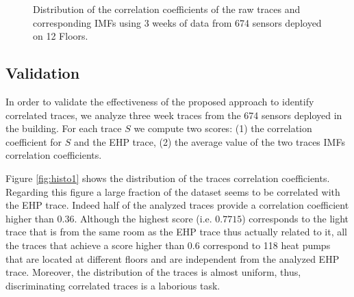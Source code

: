 \begin{figure}
\centering
 \caption{Distribution of the correlation coefficients of the raw traces and corresponding IMFs using 3 weeks of data from 674 sensors deployed on 12 Floors.}
\label{fig:histo}
\end{figure}

\subsection{Validation}


In order to validate the effectiveness of the proposed approach to identify correlated traces, we analyze three week traces from the 674 sensors deployed in the building.
For each trace $S$ we compute two scores: (1) the correlation coefficient for $S$ and the EHP trace, (2) the average value of the two traces IMFs correlation coefficients.

Figure \ref{fig:histo1} shows the distribution of the traces correlation coefficients.
Regarding this figure a large fraction of the dataset seems to be correlated with the EHP trace.
Indeed half of the analyzed traces provide a correlation coefficient higher than $0.36$.
Although the highest score (i.e. $0.7715$) corresponds to the light trace that is from the same room as the EHP trace thus actually related to it, all the traces that achieve a score higher than $0.6$  correspond to 118 heat pumps that are located at different floors and are independent from the analyzed EHP trace.
Moreover, the distribution of the traces is almost uniform, thus, discriminating correlated traces is a laborious task.

